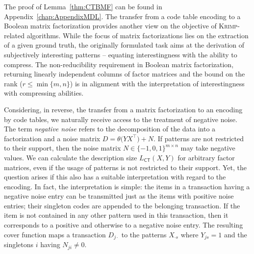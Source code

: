 The proof of Lemma~\ref{thm:CTBMF} can be found in Appendix~\ref{chap:AppendixMDL}.
The transfer from a code table encoding to a Boolean matrix factorization provides another view on the objective of \textsc{Krimp}-related algorithms. While the focus of matrix factorizations lies on the extraction of a given ground truth, the originally formulated task aims at the derivation of subjectively interesting patterns -- equating interestingness with the ability to compress. The non-reducibility requirement in Boolean matrix factorization, returning  linearly independent columns of factor matrices and the bound on the rank ($r\leq\min\{m,n\}$) is in alignment with the interpretation of interestingness with compressing abilities.

Considering, in reverse, the transfer from a matrix factorization to an encoding by code tables, we naturally receive access to the treatment of negative noise. The term \emph{negative noise} refers to the decomposition of the data into a factorization and a noise matrix $D=\theta\bigl (Y X^\top\bigr ) +N$. If patterns are not restricted to their support, then the noise matrix $N\in\{-1,0,1\}^{m\times n}$ may take negative values. We can calculate the description size $L_{\mathsf{CT}}(X,Y)$ for arbitrary factor matrices, even if the usage of patterns is not restricted to their support. Yet, the question arises if this also has a suitable interpretation with regard to the encoding. In fact, the interpretation is simple: the items in a transaction having a negative noise entry can be transmitted just as the items with positive noise entries; their singleton codes are appended to the belonging transaction. If the item is not contained in any other pattern used in this transaction, then it corresponds to a positive and otherwise to a negative noise entry. The resulting cover function maps a transaction $D_{j\cdot}$ to the patterns $X_{\cdot s}$ where $Y_{js}=1$ and the singletons $i$ having $N_{ji}\neq 0$.

